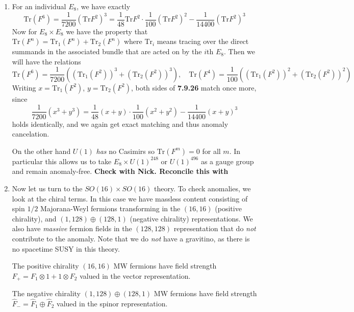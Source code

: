 \documentclass[11pt, class=article, crop=false]{standalone}
\begin{document}
\begin{enumerate}
	\item For an individual $E_8$, we have exactly
	\[
		\mathrm{Tr}(F^6) = \frac{1}{7200} (\mathrm{Tr}{F^2})^3 = \frac{1}{48} \mathrm{Tr}{F^2} \cdot \frac{1}{100} (\mathrm{Tr}{F^2})^2 - \frac{1}{14400} (\mathrm{Tr}{F^2})^3
	\]
	Now for $E_8 \times E_8$ we have the property that $\mathrm{Tr}(F^n) = \mathrm{Tr}_1(F^n) + \mathrm{Tr}_2(F^n)$ where $\mathrm{Tr}_i$ means tracing over the direct summands in the associated bundle that are acted on by the $i$th $E_8$. Then we will have the relations
	\[
		\mathrm{Tr}(F^6) = \frac{1}{7200} \left((\mathrm{Tr}_1(F^2))^3 + (\mathrm{Tr}_2(F^2))^3\right), \quad \mathrm{Tr}(F^4) = \frac{1}{100} \left((\mathrm{Tr}_1(F^2))^2 + (\mathrm{Tr}_2(F^2))^2\right)
	\]
	Writing $x = \mathrm{Tr}_1(F^2)$, $y = \mathrm{Tr}_2(F^2)$, both sides of \textbf{7.9.26} match once more, since
	\[
		\frac{1}{7200}(x^3+y^3) = \frac{1}{48}(x+y) \cdot \frac{1}{100}(x^2+y^2) - \frac{1}{14400}(x+y)^3
	\]
	holds identically, and we again get exact matching and thus anomaly cancelation.
	
	On the other hand $U(1)$ \emph{has} no Casimirs so $\mathrm{Tr}(F^m) = 0$ for all $m$. In particular this allows us to take $E_8 \times U(1)^{248}$ or $U(1)^{496}$ as a gauge group and remain anomaly-free. \textbf{Check with Nick. Reconcile this with} 
	
	\item Now let us turn to the $SO(16) \times SO(16)$ theory. To check anomalies, we look at the chiral terms. In this case we have massless content consisting of spin $1/2$ Majorana-Weyl fermions transforming in the $(16,16)$ (positive chirality), and $(1, 128) \oplus (128, 1)$ (negative chirality) representations. We also have \emph{massive} fermion fields in the $(128,128)$ representation that do \emph{not} contribute to the anomaly. Note that we do \emph{not} have a gravitino, as there is no spacetime SUSY in this theory.
	
	The positive chirality $(16,16)$ MW fermions have field strength $F_+ = F_1 \otimes 1 + 1 \otimes F_2$ valued in the vector representation. 
	
	The negative chirality $(1, 128) \oplus (128, 1)$ MW fermions have field strength $\hat F_- = \hat F_1 \oplus \hat F_2$ valued in the spinor representation. 


\end{enumerate}
\end{document}
